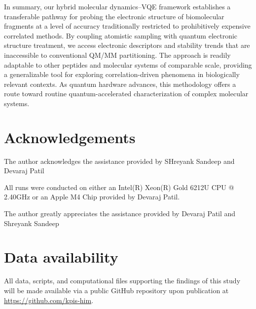 \documentclass[pdflatex,sn-mathphys-num]{sn-jnl}%
\theoremstyle{thmstyleone}%
\theoremstyle{thmstyletwo}%
\theoremstyle{thmstylethree}%
\begin{document}
In summary, our hybrid molecular dynamics–VQE\cite{peruzzo2014} framework establishes a transferable pathway for probing the electronic structure of biomolecular fragments at a level of accuracy traditionally restricted to prohibitively expensive correlated methods. By coupling atomistic sampling with quantum electronic structure treatment, we access electronic descriptors and stability trends that are inaccessible to conventional QM/MM partitioning. The approach is readily adaptable to other peptides and molecular systems of comparable scale, providing a generalizable tool for exploring correlation-driven phenomena in biologically relevant contexts. As quantum hardware advances, this methodology offers a route toward routine quantum-accelerated characterization of complex molecular systems.

\section{Acknowledgements}
The author acknowledges the assistance provided by SHreyank Sandeep and Devaraj Patil

All runs were conducted on either an Intel(R) Xeon(R) Gold 6212U CPU @ 2.40GHz or an Apple M4 Chip provided by Devaraj Patil. 

The author greatly appreciates the assistance provided by Devaraj Patil and Shreyank Sandeep

\section{Data availability}
All data, scripts, and computational files supporting the findings of this study will be made available via a public GitHub repository upon publication at \href{lebron}{https://github.com/kpis-him}.

\clearpage


\end{document}
